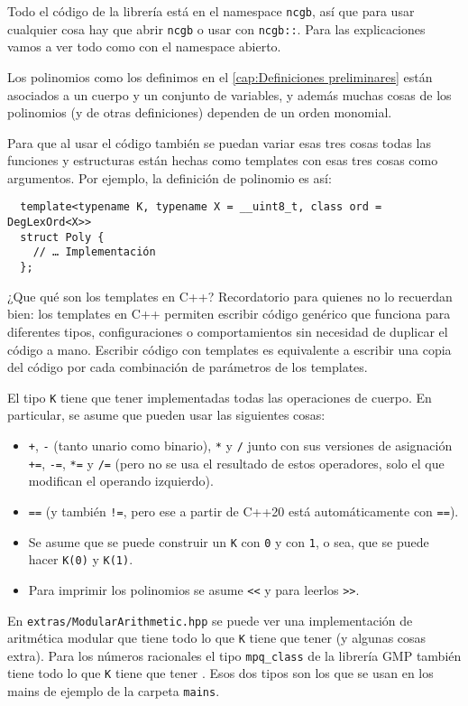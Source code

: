\documentclass[12pt]{report}
\theoremstyle{customstyle}
\theoremstyle{factstyle}
\begin{document}
Todo el código de la librería está en el namespace \texttt{ncgb}, así que para usar cualquier cosa hay que abrir \texttt{ncgb} o usar con \texttt{ncgb::}. Para las explicaciones vamos a ver todo como con el namespace abierto.

Los polinomios como los definimos en el \cref{cap:Definiciones preliminares} están asociados a un cuerpo y un conjunto de variables, y además muchas cosas de los polinomios (y de otras definiciones) dependen de un orden monomial.

Para que al usar el código también se puedan variar esas tres cosas todas las funciones y estructuras están hechas como templates con esas tres cosas como argumentos. Por ejemplo, la definición de polinomio es así:

\begin{verbatim}
  template<typename K, typename X = __uint8_t, class ord = DegLexOrd<X>>
  struct Poly {
    // … Implementación
  };
\end{verbatim}

¿Que qué son los templates en C++? Recordatorio para quienes no lo recuerdan bien: los templates en C++ permiten escribir código genérico que funciona para diferentes tipos, configuraciones o comportamientos sin necesidad de duplicar el código a mano. Escribir código con templates es equivalente a escribir una copia del código por cada combinación de parámetros de los templates.

El tipo \texttt{K} tiene que tener implementadas todas las operaciones de cuerpo. En particular, se asume que pueden usar las siguientes cosas:

\begin{itemize}
 \item \texttt{+}, \texttt{-} (tanto unario como binario), \texttt{*} y \texttt{/} junto con sus versiones de asignación \texttt{+=}, \texttt{-=}, \texttt{*=} y \texttt{/=} (pero no se usa el resultado de estos operadores, solo el que modifican el operando izquierdo).
 \item \texttt{==} (y también \texttt{!=}, pero ese a partir de C++20 está automáticamente con \texttt{==}).
 \item Se asume que se puede construir un \texttt{K} con \texttt{0} y con \texttt{1}, o sea, que se puede hacer \texttt{K(0)} y \texttt{K(1)}.
 \item Para imprimir los polinomios se asume \texttt{<<} y para leerlos \texttt{>>}.
\end{itemize}

En \texttt{extras/ModularArithmetic.hpp} se puede ver una implementación de aritmética modular que tiene todo lo que \texttt{K} tiene que tener (y algunas cosas extra). Para los números racionales el tipo \texttt{mpq\_class} de la librería GMP también tiene todo lo que \texttt{K} tiene que tener \cite{lib:gmp}. Esos dos tipos son los que se usan en los mains de ejemplo de la carpeta \texttt{mains}.
\end{document}
